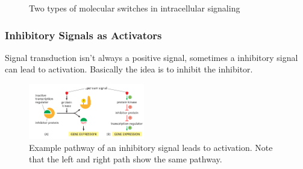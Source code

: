 \documentclass[../main.tex]{subfiles}
\begin{document}
\begin{figure}[h]
	\centering
	\hfill
	\caption{Two types of molecular switches in intracellular signaling}
\end{figure}
 


\subsubsection{Inhibitory Signals as Activators}

Signal transduction isn't always a positive signal, sometimes a inhibitory signal can lead to activation. Basically the idea is to inhibit the inhibitor.
\begin{figure}[H]
	\centering
	\includegraphics[width=0.45\textwidth]{inhib_ex}
	\caption{Example pathway of an inhibitory signal leads to activation. Note that the left and right path show the same pathway. }
\end{figure}
\end{document}
